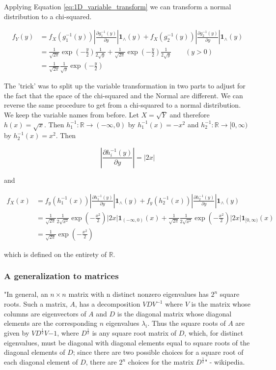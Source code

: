 Applying Equation \ref{eq:1D_variable_transform} we can transform a normal distribution to a chi-squared.

\begin{align}
	f_Y(y) &= f_X(g_1^{-1}(y))	\left\vert\frac{\partial g_1^{-1}(y)}{\partial y} \right\vert \mathbf{1}_\wedge(y) + f_X(g_2^{-1}(y))	\left\vert\frac{\partial g_2^{-1}(y)}{\partial y} \right\vert \mathbf{1}_\wedge(y) \nonumber\\
	&= \frac{1}{\sqrt{2\pi}} \exp(-\frac{y}{2}) \frac{1}{2\sqrt{y}} + \frac{1}{\sqrt{2\pi}} \exp(-\frac{y}{2}) \frac{1}{2\sqrt{y}} \qquad(y > 0)\\
	&= \frac{1}{\sqrt{2\pi}} \frac{1}{\sqrt{y}}\exp(-\frac{y}{2}) \nonumber
\end{align}

The 'trick' was to split up the variable transformation in two parts to adjust for the fact that the space of the chi-squared and the Normal are different. We can reverse the same procedure to get from a chi-squared to a normal distribution. We keep the variable names from before. Let $X = \sqrt{Y}$ and therefore $h(x) = \sqrt{x}$. Then $h_1^{-1}: \mathbb{R} \rightarrow (-\infty, 0)$ by $h_1^{-1}(x) = -x^2$ and $h_2^{-1}: \mathbb{R} \rightarrow [0, \infty)$ by $h_2^{-1}(x) = x^2$. Then

$$\left\vert\frac{\partial h_i^{-1}(y)}{\partial y} \right\vert = \vert 2x \vert $$

and
 
\begin{align}
	f_X(x) &= f_y(h_1^{-1}(x)) \left\vert\frac{\partial h_1^{-1}(y)}{\partial y} \right\vert \mathbf{1}_\wedge(y) + f_y(h_2^{-1}(x)) \left\vert\frac{\partial h_2^{-1}(y)}{\partial y} \right\vert \mathbf{1}_\wedge(y) \nonumber \\
	&= \frac{1}{\sqrt{2\pi}} \frac{1}{2\sqrt{x^2}} \exp(-\frac{x^2}{2}) |2x| \mathbf{1}_{(-\infty, 0)}(x) + \frac{1}{\sqrt{2\pi}} \frac{1}{2\sqrt{x^2}} \exp(-\frac{x^2}{2}) |2x| \mathbf{1}_{[0, \infty)}(x) \\
	&= \frac{1}{\sqrt{2\pi}} \exp(-\frac{x^2}{2}) \nonumber
\end{align}

which is defined on the entirety of $\mathbb{R}$.

\subsubsection{A generalization to matrices}

"In general, an $n\times n$ matrix with n distinct nonzero eigenvalues has $2^n$ square roots. Such a matrix, $A$, has a decomposition $VDV^{-1}$ where $V$ is the matrix whose columns are eigenvectors of $A$ and $D$ is the diagonal matrix whose diagonal elements are the corresponding $n$ eigenvalues $\lambda_i$. Thus the square roots of $A$ are given by $VD^{\frac{1}{2}} V{-1}$, where $D^\frac{1}{2}$ is any square root matrix of $D$, which, for distinct eigenvalues, must be diagonal with diagonal elements equal to square roots of the diagonal elements of $D$; since there are two possible choices for a square root of each diagonal element of $D$, there are $2^n$ choices for the matrix $D^{\frac{1}{2}}$" - wikipedia. 

